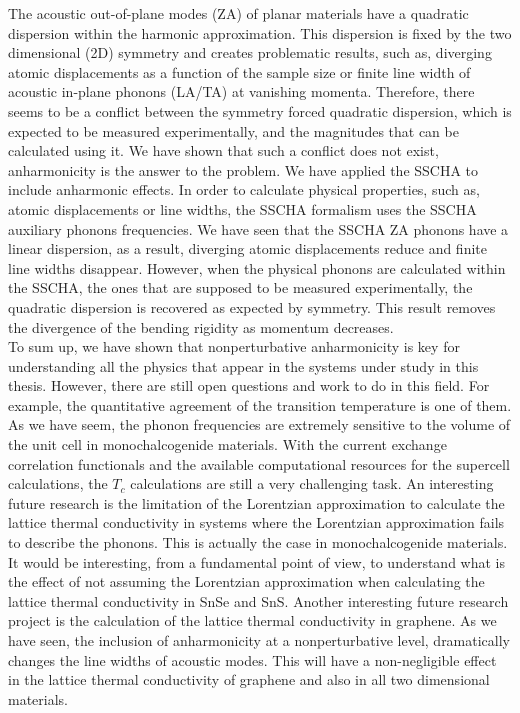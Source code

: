 The acoustic out-of-plane modes (ZA) of planar materials have a quadratic dispersion within the harmonic 
approximation. This dispersion is fixed by the two dimensional (2D) symmetry and creates problematic 
results, such as, diverging atomic displacements as a function of the sample size or finite line width of acoustic 
in-plane phonons (LA/TA) at vanishing momenta. Therefore, there seems to be a conflict between the symmetry forced 
quadratic dispersion, which is expected to be measured experimentally, and the magnitudes that can be calculated 
using it. We have shown that such a conflict does not exist, anharmonicity is the answer to the problem. We have 
applied the SSCHA to include anharmonic effects. In order to calculate physical properties, such as, atomic 
displacements or line widths, the SSCHA formalism uses the SSCHA auxiliary phonons frequencies. We have seen that 
the SSCHA ZA phonons have a linear dispersion, as a result, diverging atomic displacements reduce and finite line 
widths disappear. However, when the physical phonons are calculated within the SSCHA, the ones that are supposed to 
be measured experimentally, the quadratic dispersion is recovered as expected by symmetry. This result removes the 
divergence of the bending rigidity as momentum decreases. \\

To sum up, we have shown that nonperturbative anharmonicity is key for understanding all the physics that appear 
in the systems under study in this thesis. However, there are still open questions and work to do in this field. For 
example, the quantitative agreement of the transition temperature is one of them. As we have seem, the phonon 
frequencies are extremely sensitive to the volume of the unit cell in monochalcogenide materials. With the current 
exchange correlation functionals and the available computational resources for the supercell calculations, the 
$T_{c}$ calculations are still a very challenging task. An interesting future research is the limitation of the 
Lorentzian approximation to calculate the lattice thermal conductivity in systems where the Lorentzian approximation
fails to describe the phonons. This is actually the case in monochalcogenide materials. It would be interesting, from 
a fundamental point of view, to understand what is the effect of not assuming the Lorentzian approximation when 
calculating the lattice thermal conductivity in SnSe and SnS. Another interesting future research project is the 
calculation of the lattice thermal conductivity in graphene. As we have seen, the inclusion of anharmonicity at 
a nonperturbative level, dramatically changes the line widths of acoustic modes. This will have a non-negligible 
effect in the lattice thermal conductivity of graphene and also in all two dimensional materials.
